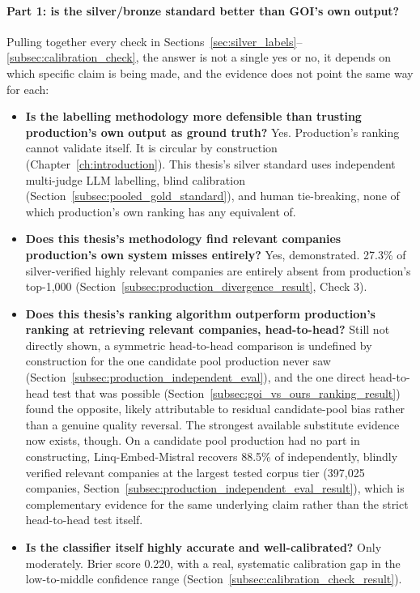 \documentclass[a4paper,oneside,bibliography=totoc]{scrbook}
\begin{document}
\label{subsec:honest_synthesis}

\paragraph{Part 1: is the silver/bronze standard better than GOI's own output?} Pulling together every check in Sections~\ref{sec:silver_labels}--\ref{subsec:calibration_check}, the answer is not a single yes or no, it depends on which specific claim is being made, and the evidence does not point the same way for each:

\begin{itemize}
\item \textbf{Is the labelling methodology more defensible than trusting production's own output as ground truth?} Yes. Production's ranking cannot validate itself. It is circular by construction (Chapter~\ref{ch:introduction}). This thesis's silver standard uses independent multi-judge LLM labelling, blind calibration (Section~\ref{subsec:pooled_gold_standard}), and human tie-breaking, none of which production's own ranking has any equivalent of.
\item \textbf{Does this thesis's methodology find relevant companies production's own system misses entirely?} Yes, demonstrated. 27.3\% of silver-verified highly relevant companies are entirely absent from production's top-1{,}000 (Section~\ref{subsec:production_divergence_result}, Check 3).
\item \textbf{Does this thesis's ranking algorithm outperform production's ranking at retrieving relevant companies, head-to-head?} Still not directly shown, a symmetric head-to-head comparison is undefined by construction for the one candidate pool production never saw (Section~\ref{subsec:production_independent_eval}), and the one direct head-to-head test that was possible (Section~\ref{subsec:goi_vs_ours_ranking_result}) found the opposite, likely attributable to residual candidate-pool bias rather than a genuine quality reversal. The strongest available substitute evidence now exists, though. On a candidate pool production had no part in constructing, Linq-Embed-Mistral recovers 88.5\% of independently, blindly verified relevant companies at the largest tested corpus tier (397,025 companies, Section~\ref{subsec:production_independent_eval_result}), which is complementary evidence for the same underlying claim rather than the strict head-to-head test itself.
\item \textbf{Is the classifier itself highly accurate and well-calibrated?} Only moderately. Brier score 0.220, with a real, systematic calibration gap in the low-to-middle confidence range (Section~\ref{subsec:calibration_check_result}).
\end{itemize}
\end{document}

